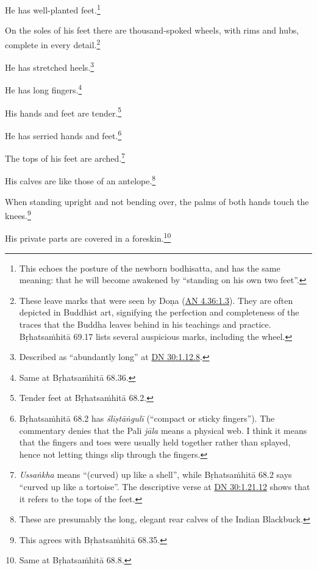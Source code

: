 \documentclass[12pt,openany]{book}%
\begin{document}
He has well-planted feet.\footnote{This echoes the posture of the newborn bodhisatta, and has the same meaning: that he will become awakened by “standing on his own two feet”. } 

On the soles of his feet there are thousand-spoked wheels, with rims and hubs, complete in every detail.\footnote{These leave marks that were seen by \textsanskrit{Doṇa} (\href{https://suttacentral.net/an4.36/en/sujato\#1.3}{AN 4.36:1.3}). They are often depicted in Buddhist art, signifying the perfection and completeness of the traces that the Buddha leaves behind in his teachings and practice. \textsanskrit{Bṛhatsaṁhitā} 69.17 lists several auspicious marks, including the wheel. } 

He has stretched heels.\footnote{Described as “abundantly long” at \href{https://suttacentral.net/dn30/en/sujato\#1.12.8}{DN 30:1.12.8}. } 

He has long fingers.\footnote{Same at \textsanskrit{Bṛhatsaṁhitā} 68.36. } 

His hands and feet are tender.\footnote{Tender feet at \textsanskrit{Bṛhatsaṁhitā} 68.2. } 

He has serried hands and feet.\footnote{\textsanskrit{Bṛhatsaṁhitā} 68.2 has \textit{\textsanskrit{śliṣtāṅgulī}} (“compact or sticky fingers”). The commentary denies that the Pali \textit{\textsanskrit{jāla}} means a physical web. I think it means that the fingers and toes were usually held together rather than splayed, hence not letting things slip through the fingers. } 

The tops of his feet are arched.\footnote{\textit{\textsanskrit{Ussaṅkha}} means “(curved) up like a shell”, while \textsanskrit{Bṛhatsaṁhitā} 68.2 says “curved up like a tortoise”. The descriptive verse at \href{https://suttacentral.net/dn30/en/sujato\#1.21.12}{DN 30:1.21.12} shows that it refers to the tops of the feet. } 

His calves are like those of an antelope.\footnote{These are presumably the long, elegant rear calves of the Indian Blackbuck. } 

When standing upright and not bending over, the palms of both hands touch the knees.\footnote{This agrees with \textsanskrit{Bṛhatsaṁhitā} 68.35. } 

His private parts are covered in a foreskin.\footnote{Same at \textsanskrit{Bṛhatsaṁhitā} 68.8. } 
\end{document}
